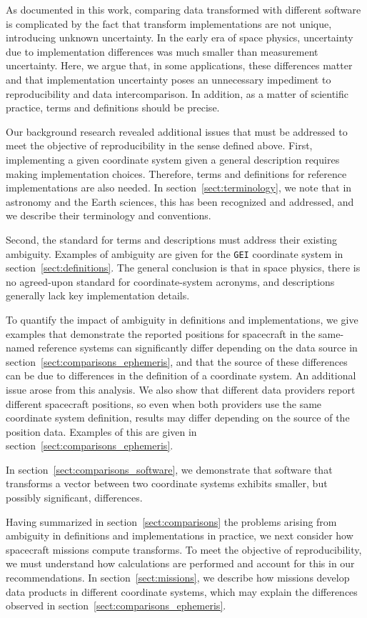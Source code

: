 \documentclass[draft]{agujournal2019}
\begin{document}
As documented in this work, comparing data transformed with different software is complicated by the fact that transform implementations are not unique, introducing unknown uncertainty. In the early era of space physics, uncertainty due to implementation differences was much smaller than measurement uncertainty. Here, we argue that, in some applications, these differences matter and that implementation uncertainty poses an unnecessary impediment to reproducibility and data intercomparison. In addition, as a matter of scientific practice, terms and definitions should be precise.

Our background research revealed additional issues that must be addressed to meet the objective of reproducibility in the sense defined above. First, implementing a given coordinate system given a general description requires making implementation choices. Therefore, terms and definitions for reference implementations are also needed. In section~\ref{sect:terminology}, we note that in astronomy and the Earth sciences, this has been recognized and addressed, and we describe their terminology and conventions.

Second, the standard for terms and descriptions must address their existing ambiguity. Examples of ambiguity are given for the \texttt{GEI} coordinate system in section~\ref{sect:definitions}. The general conclusion is that in space physics, there is no agreed-upon standard for coordinate-system acronyms, and descriptions generally lack key implementation details.

To quantify the impact of ambiguity in definitions and implementations, we give examples that demonstrate the reported positions for spacecraft in the same-named reference systems can significantly differ depending on the data source in section~\ref{sect:comparisons_ephemeris}, and that the source of these differences can be due to differences in the definition of a coordinate system. An additional issue arose from this analysis. We also show that different data providers report different spacecraft positions, so even when both providers use the same coordinate system definition, results may differ depending on the source of the position data. Examples of this are given in section~\ref{sect:comparisons_ephemeris}.

In section~\ref{sect:comparisons_software}, we demonstrate that software that transforms a vector between two coordinate systems exhibits smaller, but possibly significant, differences.

Having summarized in section~\ref{sect:comparisons} the problems arising from ambiguity in definitions and implementations in practice, we next consider how spacecraft missions compute transforms. To meet the objective of reproducibility, we must understand how calculations are performed and account for this in our recommendations. In section~\ref{sect:missions}, we describe how missions develop data products in different coordinate systems, which may explain the differences observed in section~\ref{sect:comparisons_ephemeris}.
\end{document}
